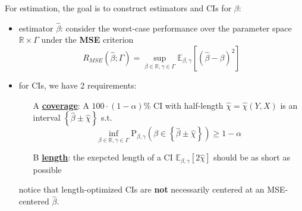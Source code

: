 \documentclass[twoside]{article}
\theoremstyle{definition}
\begin{document}
For estimation, the goal is to construct estimators and CIs for $\beta$:
\begin{itemize}
  \item estimator $\hat{\beta}$: consider the worst-case performance over the parameter space $\mathbb{R}\times\Gamma$ under the \textbf{MSE} criterion
  $$
  R_{MSE}\left(\hat{\beta};\Gamma\right)=\sup_{\beta\in\mathbb{R},\gamma\in\Gamma}\mathbb{E}_{\beta,\gamma}\left[\left(\hat{\beta}-\beta\right)^2\right]
  $$
  \item for CIs, we have 2 requirements:
  \begin{itemize}
    \item[A] \underline{\textbf{coverage}}: A $100\cdot(1-\alpha)\%$ CI with half-length $\hat{\chi}=\hat{\chi}(Y,X)$ is an interval $\left\{\hat{\beta}\pm \hat{\chi}\right\}$ s.t.$$ \inf_{\beta\in\mathbb{R},\gamma\in\Gamma} \mathrm{P}_{\beta,\gamma}\left(\beta\in\left\{\hat{\beta}\pm\hat{\chi}\right\}\right) \geq 1-\alpha $$
    \item[B] \underline{\textbf{length}}: the exepcted length of a CI $\mathbb{E}_{\beta,\gamma}\left[2\hat{\chi}\right]$ should be as short as possible
  \end{itemize}
  notice that length-optimized CIs are \textbf{not} necessarily centered at an MSE-centered $\hat{\beta}$.
\end{itemize}
\end{document}
